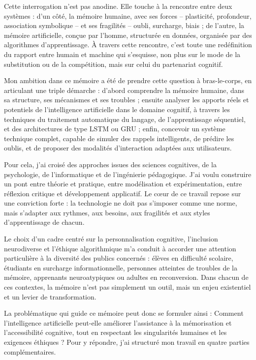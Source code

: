 \documentclass[11pt,a4paper]{report}
\begin{document}
Cette interrogation n’est pas anodine. Elle touche à la rencontre entre deux systèmes : d’un côté, la mémoire humaine, avec ses forces – plasticité, profondeur, association symbolique – et ses fragilités – oubli, surcharge, biais ; de l’autre, la mémoire artificielle, conçue par l’homme, structurée en données, organisée par des algorithmes d’apprentissage. À travers cette rencontre, c’est toute une redéfinition du rapport entre humain et machine qui s’esquisse, non plus sur le mode de la substitution ou de la compétition, mais sur celui du partenariat cognitif.

Mon ambition dans ce mémoire a été de prendre cette question à bras-le-corps, en articulant une triple démarche : d’abord comprendre la mémoire humaine, dans sa structure, ses mécanismes et ses troubles ; ensuite analyser les apports réels et potentiels de l’intelligence artificielle dans le domaine cognitif, à travers les techniques du traitement automatique du langage, de l’apprentissage séquentiel, et des architectures de type LSTM ou GRU ; enfin, concevoir un système technique complet, capable de simuler des rappels intelligents, de prédire les oublis, et de proposer des modalités d’interaction adaptées aux utilisateurs.

Pour cela, j’ai croisé des approches issues des sciences cognitives, de la psychologie, de l’informatique et de l’ingénierie pédagogique. J’ai voulu construire un pont entre théorie et pratique, entre modélisation et expérimentation, entre réflexion critique et développement applicatif. Le cœur de ce travail repose sur une conviction forte : la technologie ne doit pas s’imposer comme une norme, mais s’adapter aux rythmes, aux besoins, aux fragilités et aux styles d’apprentissage de chacun.

Le choix d’un cadre centré sur la personnalisation cognitive, l’inclusion neurodiverse et l’éthique algorithmique m’a conduit à accorder une attention particulière à la diversité des publics concernés : élèves en difficulté scolaire, étudiants en surcharge informationnelle, personnes atteintes de troubles de la mémoire, apprenants neuroatypiques ou adultes en reconversion. Dans chacun de ces contextes, la mémoire n’est pas simplement un outil, mais un enjeu existentiel et un levier de transformation.

La problématique qui guide ce mémoire peut donc se formuler ainsi : Comment l’intelligence artificielle peut-elle améliorer l’assistance à la mémorisation et l’accessibilité cognitive, tout en respectant les singularités humaines et les exigences éthiques ? Pour y répondre, j’ai structuré mon travail en quatre parties complémentaires.
\end{document}
